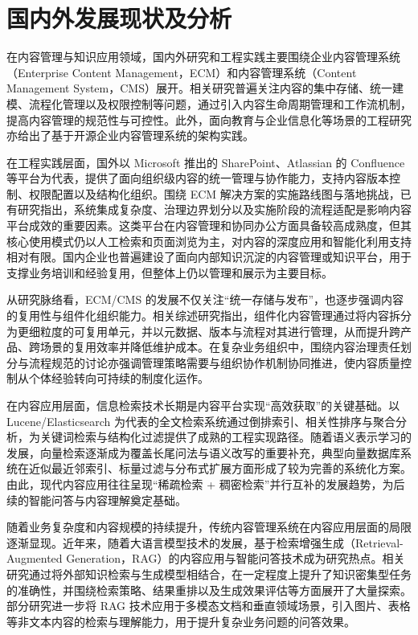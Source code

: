 \section{国内外发展现状及分析}

在内容管理与知识应用领域，国内外研究和工程实践主要围绕企业内容管理系统（Enterprise Content Management，ECM）和内容管理系统（Content Management System，CMS）展开。相关研究普遍关注内容的集中存储、统一建模、流程化管理以及权限控制等问题，通过引入内容生命周期管理和工作流机制，提高内容管理的规范性与可控性\cite{alalwan2012enterprise,le2015enterprise}。此外，面向教育与企业信息化等场景的工程研究亦给出了基于开源企业内容管理系统的架构实践\cite{maican2016system}。

在工程实践层面，国外以 Microsoft 推出的 SharePoint、Atlassian 的 Confluence 等平台为代表，提供了面向组织级内容的统一管理与协作能力，支持内容版本控制、权限配置以及结构化组织\cite{khumalo2019sharepoint,kaleliouglu2023implementing}。围绕 ECM 解决方案的实施路线图与落地挑战，已有研究指出，系统集成复杂度、治理边界划分以及实施阶段的流程适配是影响内容平台成效的重要因素\cite{hullavarad2015enterprise}。这类平台在内容管理和协同办公方面具备较高成熟度，但其核心使用模式仍以人工检索和页面浏览为主，对内容的深度应用和智能化利用支持相对有限。国内企业也普遍建设了面向内部知识沉淀的内容管理或知识平台，用于支撑业务培训和经验复用，但整体上仍以管理和展示为主要目标。

从研究脉络看，ECM/CMS 的发展不仅关注“统一存储与发布”，也逐步强调内容的复用性与组件化组织能力。相关综述研究指出，组件化内容管理通过将内容拆分为更细粒度的可复用单元，并以元数据、版本与流程对其进行管理，从而提升跨产品、跨场景的复用效率并降低维护成本\cite{andersen2016current}。在复杂业务组织中，围绕内容治理责任划分与流程规范的讨论亦强调管理策略需要与组织协作机制协同推进，使内容质量控制从个体经验转向可持续的制度化运作\cite{alalwan2012enterprise,le2015enterprise}。

在内容应用层面，信息检索技术长期是内容平台实现“高效获取”的关键基础。以 Lucene/Elasticsearch 为代表的全文检索系统通过倒排索引、相关性排序与聚合分析，为关键词检索与结构化过滤提供了成熟的工程实现路径\cite{bialecki2012apache}。随着语义表示学习的发展，向量检索逐渐成为覆盖长尾问法与语义改写的重要补充，典型向量数据库系统在近似最近邻索引、标量过滤与分布式扩展方面形成了较为完善的系统化方案\cite{wang2021milvus}。由此，现代内容应用往往呈现“稀疏检索 + 稠密检索”并行互补的发展趋势，为后续的智能问答与内容理解奠定基础。

随着业务复杂度和内容规模的持续提升，传统内容管理系统在内容应用层面的局限逐渐显现。近年来，随着大语言模型技术的发展，基于检索增强生成（Retrieval-Augmented Generation，RAG）的内容应用与智能问答技术成为研究热点。相关研究通过将外部知识检索与生成模型相结合，在一定程度上提升了知识密集型任务的准确性，并围绕检索策略、结果重排以及生成效果评估等方面展开了大量探索\cite{fan2024survey}。部分研究进一步将 RAG 技术应用于多模态文档和垂直领域场景，引入图片、表格等非文本内容的检索与理解能力，用于提升复杂业务问题的问答效果\cite{ke2025large,yu2025mind,shen2025global,drushchak2025multimodal}。


